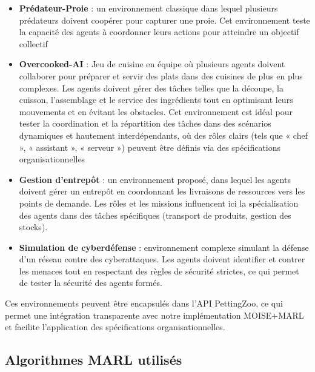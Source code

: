 \begin{itemize}

    \item \textbf{Prédateur-Proie} : un environnement classique dans lequel plusieurs prédateurs doivent coopérer pour capturer une proie. Cet environnement teste la capacité des agents à coordonner leurs actions pour atteindre un objectif collectif\cite{lowe2017multi}

    \item \textbf{Overcooked-AI} : Jeu de cuisine en équipe où plusieurs agents doivent collaborer pour préparer et servir des plats dans des cuisines de plus en plus complexes\cite{overcookedai}. Les agents doivent gérer des tâches telles que la découpe, la cuisson, l'assemblage et le service des ingrédients tout en optimisant leurs mouvements et en évitant les obstacles. Cet environnement est idéal pour tester la coordination et la répartition des tâches dans des scénarios dynamiques et hautement interdépendants, où des rôles clairs (tels que « chef », « assistant », « serveur ») peuvent être définis via des spécifications organisationnelles



    \item \textbf{Gestion d'entrepôt} : un environnement proposé, dans lequel les agents doivent gérer un entrepôt en coordonnant les livraisons de ressources vers les points de demande. Les rôles et les missions influencent ici la spécialisation des agents dans des tâches spécifiques (transport de produits, gestion des stocks).



    \item \textbf{Simulation de cyberdéfense} : environnement complexe simulant la défense d'un réseau contre des cyberattaques. Les agents doivent identifier et contrer les menaces tout en respectant des règles de sécurité strictes, ce qui permet de tester la sécurité des agents formés\cite{Maxwell2021}.
\end{itemize}

Ces environnements peuvent être encapsulés dans l'API PettingZoo, ce qui permet une intégration transparente avec notre implémentation MOISE+MARL et facilite l'application des spécifications organisationnelles.

\subsection{Algorithmes MARL utilisés}


